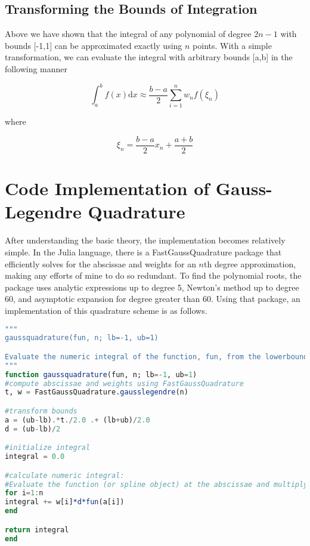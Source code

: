 \subsection{Transforming the Bounds of Integration}

Above we have shown that the integral of any polynomial of degree $2n-1$ with bounds [-1,1] can be approximated exactly using $n$ points. With a simple transformation, we can evaluate the integral with arbitrary bounds [a,b] in the following manner

\begin{equation} \int_{a}^{b} f(x) \mathrm{d}x \approx \frac{b-a}{2} \sum_{i=1}^n w_n f(\xi_n) \end{equation}

where

\begin{equation} \xi_n = \frac{b-a}{2}x_n + \frac{a+b}{2} \end{equation}

\section{Code Implementation of Gauss-Legendre Quadrature}
After understanding the basic theory, the implementation becomes relatively simple. In the Julia language, there is a FastGaussQuadrature package that efficiently solves for the abscissae and weights for an $n$th degree approximation, making any efforts of mine to do so redundant. To find the polynomial roots, the package uses analytic expressions up to degree 5, Newton's method up to degree 60, and asymptotic expansion for degree greater than 60. Using that package, an implementation of this quadrature scheme is as follows.

\begin{lstlisting}[language=julia]
"""
gaussquadrature(fun, n; lb=-1, ub=1)

Evaluate the numeric integral of the function, fun, from the lowerbound, lb, to the upper bound, ub, using an n-th degree Gauss-Legendre quadrature rule.
"""
function gaussquadrature(fun, n; lb=-1, ub=1)
#compute abscissae and weights using FastGaussQuadrature
t, w = FastGaussQuadrature.gausslegendre(n)

#transform bounds
a = (ub-lb).*t./2.0 .+ (lb+ub)/2.0
d = (ub-lb)/2

#initialize integral
integral = 0.0

#calculate numeric integral:
#Evaluate the function (or spline object) at the abscissae and multiply by the weights; sum the values together to obtain an estimate of the integral.
for i=1:n
integral += w[i]*d*fun(a[i])
end

return integral
end
\end{lstlisting}


